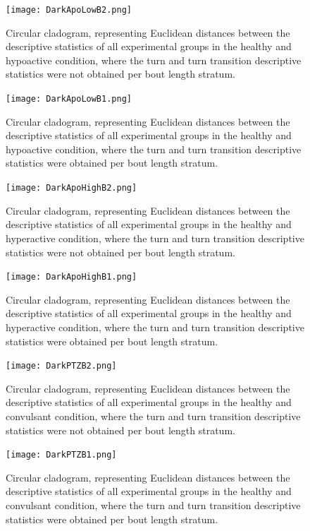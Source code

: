 \documentclass[a4paper,12pt]{article}
\begin{document}
\begin{figure}[h!]
\begin{center}
\texttt{[image: DarkApoLowB2.png]}
\caption{Circular cladogram, representing Euclidean distances between the descriptive statistics of all experimental groups in the healthy and hypoactive condition, where the turn and turn transition descriptive statistics were not obtained per bout length stratum.}
\end{center}
\end{figure}
\begin{figure}[h!]
\begin{center}
\texttt{[image: DarkApoLowB1.png]}
\caption{Circular cladogram, representing Euclidean distances between the descriptive statistics of all experimental groups in the healthy and hypoactive condition, where the turn and turn transition descriptive statistics were obtained per bout length stratum.}
\end{center}
\end{figure}
\newpage
\begin{figure}[h!]
\begin{center}
\texttt{[image: DarkApoHighB2.png]}
\caption{Circular cladogram, representing Euclidean distances between the descriptive statistics of all experimental groups in the healthy and hyperactive condition, where the turn and turn transition descriptive statistics were not obtained per bout length stratum.}
\end{center}
\end{figure}
\begin{figure}[h!]
\begin{center}
\texttt{[image: DarkApoHighB1.png]}
\caption{Circular cladogram, representing Euclidean distances between the descriptive statistics of all experimental groups in the healthy and hyperactive condition, where the turn and turn transition descriptive statistics were obtained per bout length stratum.}
\end{center}
\end{figure}
\newpage
\begin{figure}[h!]
\begin{center}
\texttt{[image: DarkPTZB2.png]}
\caption{Circular cladogram, representing Euclidean distances between the descriptive statistics of all experimental groups in the healthy and convulsant condition, where the turn and turn transition descriptive statistics were not obtained per bout length stratum.}
\end{center}
\end{figure}
\begin{figure}[h!]
\begin{center}
\texttt{[image: DarkPTZB1.png]}
\caption{Circular cladogram, representing Euclidean distances between the descriptive statistics of all experimental groups in the healthy and convulsant condition, where the turn and turn transition descriptive statistics were obtained per bout length stratum.}
\end{center}
\end{figure}
\newpage
\end{document}
